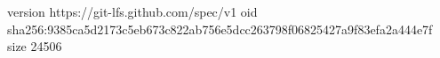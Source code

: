 version https://git-lfs.github.com/spec/v1
oid sha256:9385ca5d2173c5eb673c822ab756e5dcc263798f06825427a9f83efa2a444e7f
size 24506
